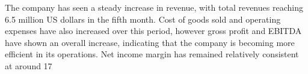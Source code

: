 

The company has seen a steady increase in revenue, with total revenues reaching 6.5 million US dollars in the fifth month. Cost of goods sold and operating expenses have also increased over this period, however gross profit and EBITDA have shown an overall increase, indicating that the company is becoming more efficient in its operations. Net income margin has remained relatively consistent at around 17%